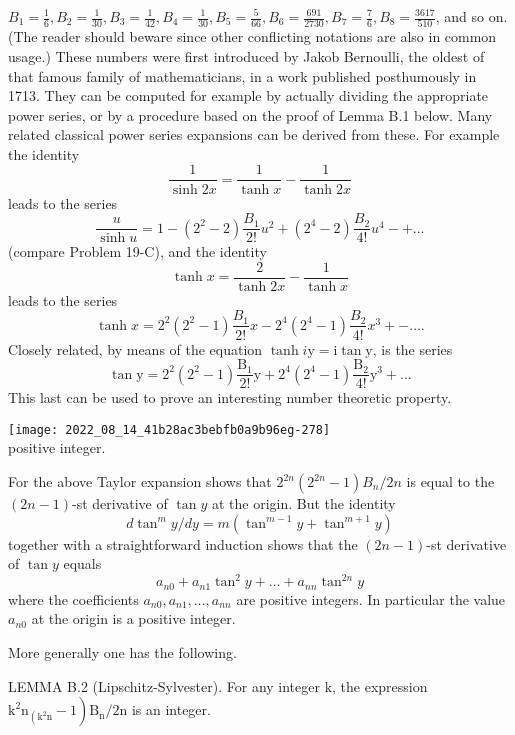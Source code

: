 \documentclass[10pt]{article}
\begin{document}
$B_{1}=\frac{1}{6}, B_{2}=\frac{1}{30}, B_{3}=\frac{1}{42}, B_{4}=\frac{1}{30}, B_{5}=\frac{5}{66}, B_{6}=\frac{691}{2730}, B_{7}=\frac{7}{6}, B_{8}=\frac{3617}{510}$, and so on. (The reader should beware since other conflicting notations are also in common usage.) These numbers were first introduced by Jakob Bernoulli, the oldest of that famous family of mathematicians, in a work published posthumously in 1713. They can be computed for example by actually dividing the appropriate power series, or by a procedure based on the proof of Lemma B.1 below. Many related classical power series expansions can be derived from these. For example the identity
$$
\frac{1}{\sinh 2 x}=\frac{1}{\tanh x}-\frac{1}{\tanh 2 x}
$$
leads to the series
$$
\frac{u}{\sinh u}=1-\left(2^{2}-2\right) \frac{B_{1}}{2 !} u^{2}+\left(2^{4}-2\right) \frac{B_{2}}{4 !} u^{4}-+\ldots
$$
(compare Problem 19-C), and the identity
$$
\tanh x=\frac{2}{\tanh 2 x}-\frac{1}{\tanh x}
$$
leads to the series
$$
\tanh x=2^{2}\left(2^{2}-1\right) \frac{B_{1}}{2 !} x-2^{4}\left(2^{4}-1\right) \frac{B_{2}}{4 !} x^{3}+-\ldots .
$$
Closely related, by means of the equation $\tanh i \mathrm{y}=\mathrm{i} \tan \mathrm{y}$, is the series
$$
\tan \mathrm{y}=2^{2}\left(2^{2}-1\right) \frac{\mathrm{B}_{1}}{2 !} \mathrm{y}+2^{4}\left(2^{4}-1\right) \frac{\mathrm{B}_{2}}{4 !} \mathrm{y}^{3}+\ldots
$$
This last can be used to prove an interesting number theoretic property.

\texttt{[image: 2022\_08\_14\_41b28ac3bebfb0a9b96eg-278]}\\
positive integer.

For the above Taylor expansion shows that $2^{2 n}\left(2^{2 n}-1\right) B_{n} / 2 n$ is equal to the $(2 n-1)$-st derivative of $\tan y$ at the origin. But the identity
$$
d \tan ^{m} y / d y=m\left(\tan ^{m-1} y+\tan ^{m+1} y\right)
$$
together with a straightforward induction shows that the $(2 n-1)$-st derivative of $\tan y$ equals
$$
a_{n 0}+a_{n 1} \tan ^{2} y+\ldots+a_{n n} \tan ^{2 n} y
$$
where the coefficients $a_{n 0}, a_{n 1}, \ldots, a_{n n}$ are positive integers. In particular the value $a_{n 0}$ at the origin is a positive integer.

More generally one has the following.

LEMMA B.2 (Lipschitz-Sylvester). For any integer $\mathrm{k}$, the expression $\left.\mathrm{k}^{2} \mathrm{n}_{\left(\mathrm{k}^{2} \mathrm{n}\right.}-1\right) \mathrm{B}_{\mathrm{n}} / 2 \mathrm{n}$ is an integer.
\end{document}
